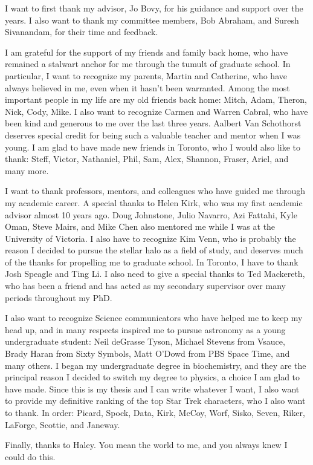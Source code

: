 \begin{acknowledgements}
    I want to first thank my advisor, Jo Bovy, for his guidance and support over the years. I also want to thank my committee members, Bob Abraham, and Suresh Sivanandam, for their time and feedback.
    
    I am grateful for the support of my friends and family back home, who have remained a stalwart anchor for me through the tumult of graduate school. In particular, I want to recognize my parents, Martin and Catherine, who have always believed in me, even when it hasn't been warranted. Among the most important people in my life are my old friends back home: Mitch, Adam, Theron, Nick, Cody, Mike. I also want to recognize Carmen and Warren Cabral, who have been kind and generous to me over the last three years. Aalbert Van Schothorst deserves special credit for being such a valuable teacher and mentor when I was young. I am glad to have made new friends in Toronto, who I would also like to thank: Steff, Victor, Nathaniel, Phil, Sam, Alex, Shannon, Fraser, Ariel, and many more.
    
    I want to thank professors, mentors, and colleagues who have guided me through my academic career. A special thanks to Helen Kirk, who was my first academic advisor almost 10 years ago. Doug Johnstone, Julio Navarro, Azi Fattahi, Kyle Oman, Steve Mairs, and Mike Chen also mentored me while I was at the University of Victoria. I also have to recognize Kim Venn, who is probably the reason I decided to pursue the stellar halo as a field of study, and deserves much of the thanks for propelling me to graduate school. In Toronto, I have to thank Josh Speagle and Ting Li. I also need to give a special thanks to Ted Mackereth, who has been a friend and has acted as my secondary supervisor over many periods throughout my PhD.
    
    I also want to recognize Science communicators who have helped me to keep my head up, and in many respects inspired me to pursue astronomy as a young undergraduate student: Neil deGrasse Tyson, Michael Stevens from Vsauce, Brady Haran from Sixty Symbols, Matt O'Dowd from PBS Space Time, and many others. I began my undergraduate degree in biochemistry, and they are the principal reason I decided to switch my degree to physics, a choice I am glad to have made. Since this is my thesis and I can write whatever I want, I also want to provide my definitive ranking of the top Star Trek characters, who I also want to thank. In order: Picard, Spock, Data, Kirk, McCoy, Worf, Sisko, Seven, Riker, LaForge, Scottie, and Janeway.

    Finally, thanks to Haley. You mean the world to me, and you always knew I could do this.

\end{acknowledgements}